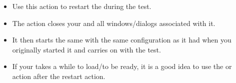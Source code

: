 
\begin{itemize}
\item Use this action to restart the \gdaut{} during the test. 
\item The action closes your \gdaut{} and all windows/dialogs associated with it. 
\item It then starts the same \gdaut{} with the same configuration as it had when you originally started it and carries on with the test. 
\item If your \gdaut{} takes a while to load/to be ready, it is a good idea to use the  or  action after the restart action. 
\end{itemize}
